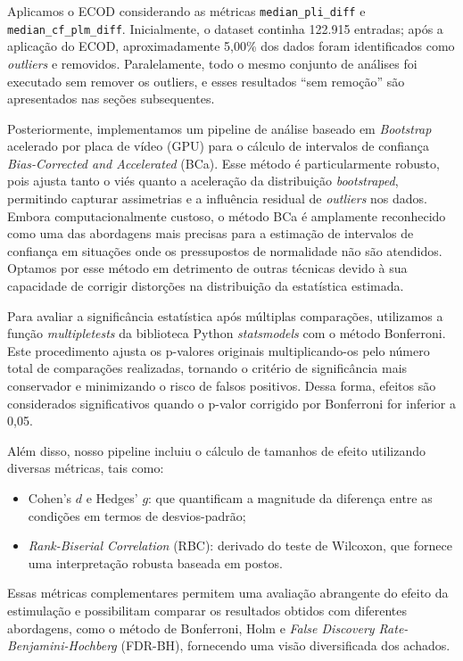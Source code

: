 Aplicamos o ECOD considerando as métricas \texttt{median\_pli\_diff} e \texttt{median\_cf\_plm\_diff}. Inicialmente, o dataset continha 122.915 entradas; após a aplicação do ECOD, aproximadamente 5,00\% dos dados foram identificados como \textit{outliers} e removidos. Paralelamente, todo o mesmo conjunto de análises foi executado sem remover os outliers, e esses resultados ``sem remoção'' são apresentados nas seções subsequentes.

Posteriormente, implementamos um pipeline de análise baseado em \textit{Bootstrap} acelerado por placa de vídeo (GPU) para o cálculo de intervalos de confiança \textit{Bias-Corrected and Accelerated} (BCa). Esse método é particularmente robusto, pois ajusta tanto o viés quanto a aceleração da distribuição \textit{bootstraped}, permitindo capturar assimetrias e a influência residual de \textit{outliers} nos dados. Embora computacionalmente custoso, o método BCa é amplamente reconhecido como uma das abordagens mais precisas para a estimação de intervalos de confiança em situações onde os pressupostos de normalidade não são atendidos. Optamos por esse método em detrimento de outras técnicas devido à sua capacidade de corrigir distorções na distribuição da estatística estimada.

Para avaliar a significância estatística após múltiplas comparações, utilizamos a função \textit{multipletests} da biblioteca Python \textit{statsmodels} com o método Bonferroni. Este procedimento ajusta os p-valores originais multiplicando-os pelo número total de comparações realizadas, tornando o critério de significância mais conservador e minimizando o risco de falsos positivos. Dessa forma, efeitos são considerados significativos quando o p-valor corrigido por Bonferroni for inferior a 0,05.

Além disso, nosso pipeline incluiu o cálculo de tamanhos de efeito utilizando diversas métricas, tais como:
\begin{itemize}
    \item Cohen's \(d\) e Hedges' \(g\): que quantificam a magnitude da diferença entre as condições em termos de desvios-padrão;
    \item \textit{Rank-Biserial Correlation} (RBC): derivado do teste de Wilcoxon, que fornece uma interpretação robusta baseada em postos.
\end{itemize}

Essas métricas complementares permitem uma avaliação abrangente do efeito da estimulação e possibilitam comparar os resultados obtidos com diferentes abordagens, como o método de Bonferroni, Holm e \textit{False Discovery Rate-Benjamini-Hochberg} (FDR-BH), fornecendo uma visão diversificada dos achados.

